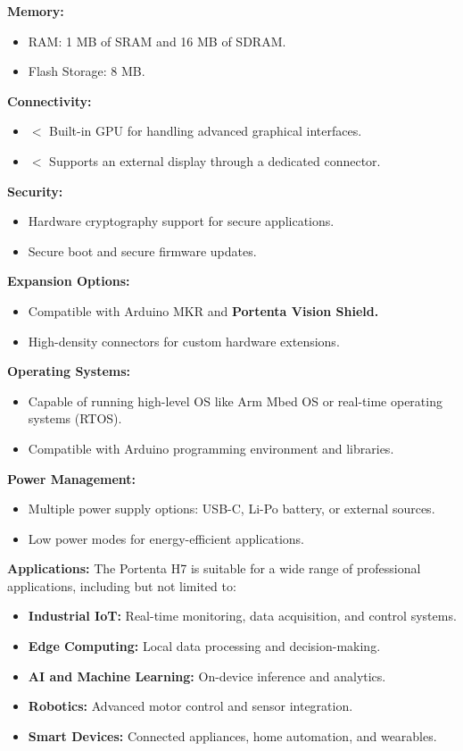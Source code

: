 \textbf{Memory:}
\begin{itemize}
	\item RAM: 1 MB of SRAM and 16 MB of SDRAM.
	\item Flash Storage: 8 MB.
\end{itemize}

\textbf{Connectivity:}
\begin{itemize}
	\item $<$ Built-in GPU for handling advanced graphical interfaces. 
	\item $<$ Supports an external display through a dedicated connector.
\end{itemize}

\textbf{Security:}
\begin{itemize}
	\item Hardware cryptography support for secure applications.
	\item Secure boot and secure firmware updates.
\end{itemize}

\textbf{Expansion Options:}
\begin{itemize}
	\item Compatible with Arduino MKR and \textbf{Portenta Vision Shield.}
	\item High-density connectors for custom hardware extensions.
\end{itemize}

\textbf{Operating Systems:}
\begin{itemize}
	\item Capable of running high-level OS like Arm Mbed OS or real-time operating systems (RTOS).
	\item Compatible with Arduino programming environment and libraries.
\end{itemize}

\textbf{Power Management:}
\begin{itemize}
	\item Multiple power supply options: USB-C, Li-Po battery, or external sources.
	\item Low power modes for energy-efficient applications.
\end{itemize}

\textbf{Applications:} \newline
	The Portenta H7 is suitable for a wide range of professional applications, including but not limited to:
\begin{itemize}
	\item \textbf{Industrial IoT:} Real-time monitoring, data acquisition, and control systems.
	\item \textbf{Edge Computing:} Local data processing and decision-making.
	\item \textbf{AI and Machine Learning:} On-device inference and analytics.
	\item \textbf{Robotics:} Advanced motor control and sensor integration.
	\item \textbf{Smart Devices:} Connected appliances, home automation, and wearables.
\end{itemize}

